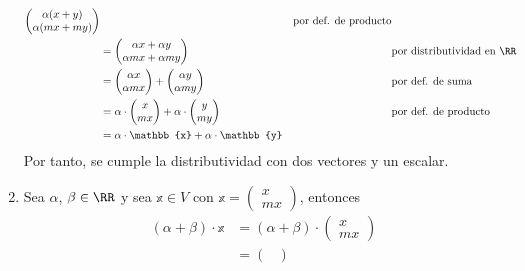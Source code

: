 \begin{examplebox}{}{}
\begin{enumerate}[label=\roman*), topsep=6pt, itemsep=0pt]
\begin{align*}
\begin{pmatrix}
                \alpha (x + y) \\
                \alpha (mx + my)
            \end{pmatrix} && \text{por def. de producto} \\
            & = \begin{pmatrix}
                \alpha x + \alpha y \\
                \alpha mx + \alpha my
            \end{pmatrix} && \text{por distributividad en $\RR$} \\
            & = \begin{pmatrix}
                \alpha x \\
                \alpha mx
            \end{pmatrix} + \begin{pmatrix}
                \alpha y \\
                \alpha my
            \end{pmatrix} && \text{por def. de suma} \\
            & = \alpha \cdot \begin{pmatrix}
                x \\
                mx
            \end{pmatrix} + \alpha \cdot \begin{pmatrix}
                y \\
                my
            \end{pmatrix} && \text{por def. de producto} \\
            & = \alpha \cdot \mathbb{x} + \alpha \cdot \mathbb{y}
        \end{align*}
        Por tanto, se cumple la distributividad con dos vectores y un escalar.
        \item Sea $\alpha$, $\beta \in \RR$ y sea $\mathbb{x} \in V$ con $\mathbb{x} = \begin{pmatrix}
            x \\
            mx
        \end{pmatrix}$, entonces
        \begin{align*}
            (\alpha + \beta) \cdot \mathbb{x} & = (\alpha + \beta) \cdot \begin{pmatrix}
                x \\
                mx
            \end{pmatrix} \\
            & = \begin{pmatrix}

\end{pmatrix}
\end{align*}
\end{enumerate}
\end{examplebox}
